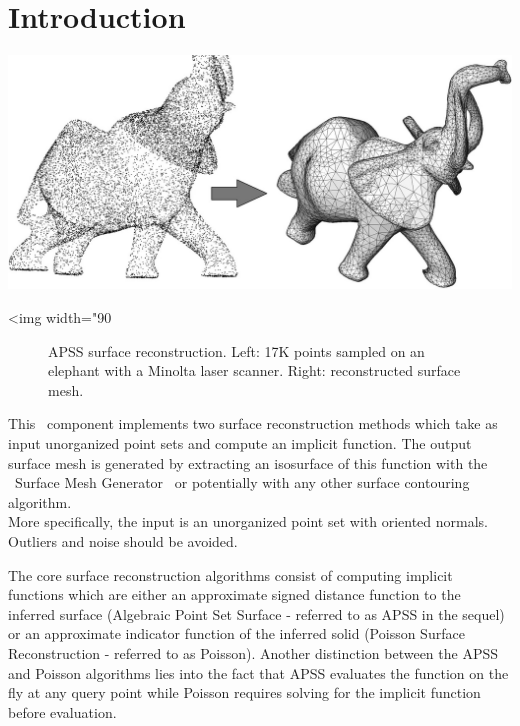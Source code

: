 \section{Introduction}

\begin{center}
    \label{Surface_reconstruction_points_3-fig-introduction}
    \begin{ccTexOnly}
        \includegraphics[width=1.0\textwidth]{Surface_reconstruction_points_3/introduction} %
    \end{ccTexOnly}
    \begin{ccHtmlOnly}
        <img width="90%
    \end{ccHtmlOnly}
    \begin{figure}[h]
        \caption{APSS surface reconstruction.
                 Left: 17K points sampled on an elephant with a Minolta laser scanner.
                 Right: reconstructed surface mesh.}
    \end{figure}
\end{center}

This \cgal\ component implements two surface reconstruction methods which take as input unorganized point sets and compute an implicit function. The output surface mesh is generated by extracting an isosurface of this function with the \cgal\ Surface Mesh Generator~\cite{cgal:ry-gsddrm-06} or potentially with any other surface contouring algorithm. \\
More specifically, the input is an unorganized point set with oriented normals. Outliers and noise should be avoided.

The core surface reconstruction algorithms consist of computing implicit functions which are either an approximate signed distance function to the inferred surface (Algebraic Point Set Surface - referred to as APSS in the sequel) or an approximate indicator function of the inferred solid (Poisson Surface Reconstruction - referred to as Poisson). Another distinction between the APSS and Poisson algorithms lies into the fact that APSS evaluates the function on the fly at any query point while Poisson requires solving for the implicit function before evaluation.

